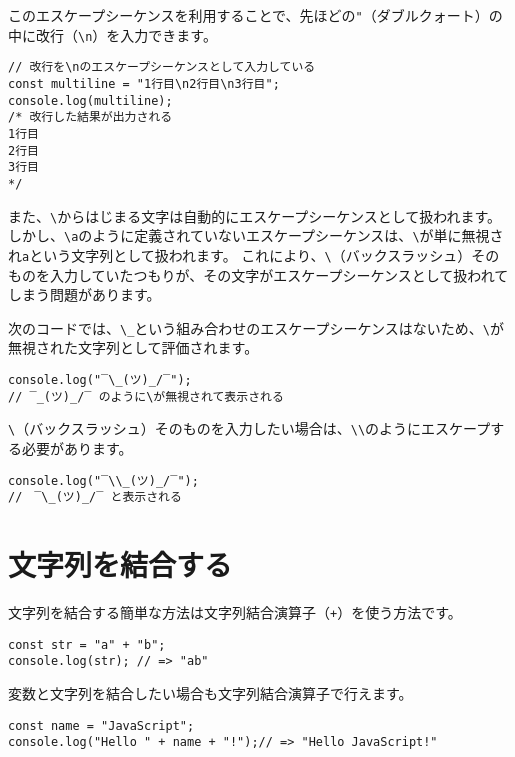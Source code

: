 このエスケープシーケンスを利用することで、先ほどの\texttt{"}（ダブルクォート）の中に改行（\texttt{\textbackslash n}）を入力できます。

\begin{lstlisting}
// 改行を\nのエスケープシーケンスとして入力している
const multiline = "1行目\n2行目\n3行目";
console.log(multiline); 
/* 改行した結果が出力される
1行目
2行目
3行目
*/
\end{lstlisting}

また、\texttt{\textbackslash}からはじまる文字は自動的にエスケープシーケンスとして扱われます。
しかし、\texttt{\textbackslash a}のように定義されていないエスケープシーケンスは、\texttt{\textbackslash}が単に無視され\texttt{a}という文字列として扱われます。
これにより、\texttt{\textbackslash}（バックスラッシュ）そのものを入力していたつもりが、その文字がエスケープシーケンスとして扱われてしまう問題があります。

次のコードでは、\texttt{\textbackslash\_}という組み合わせのエスケープシーケンスはないため、\texttt{\textbackslash}が無視された文字列として評価されます。

\begin{lstlisting}
console.log("‾\_(ツ)_/‾"); 
// ‾_(ツ)_/‾ のように\が無視されて表示される
\end{lstlisting}

\texttt{\textbackslash}（バックスラッシュ）そのものを入力したい場合は、\texttt{\textbackslash\textbackslash}のようにエスケープする必要があります。

\begin{lstlisting}
console.log("‾\\_(ツ)_/‾"); 
//　‾\_(ツ)_/‾ と表示される
\end{lstlisting}

\hypertarget{concat}{%
\section{文字列を結合する}\label{concat}}

文字列を結合する簡単な方法は文字列結合演算子（\texttt{+}）を使う方法です。

\begin{lstlisting}
const str = "a" + "b";
console.log(str); // => "ab"
\end{lstlisting}

変数と文字列を結合したい場合も文字列結合演算子で行えます。

\begin{lstlisting}
const name = "JavaScript";
console.log("Hello " + name + "!");// => "Hello JavaScript!"
\end{lstlisting}

